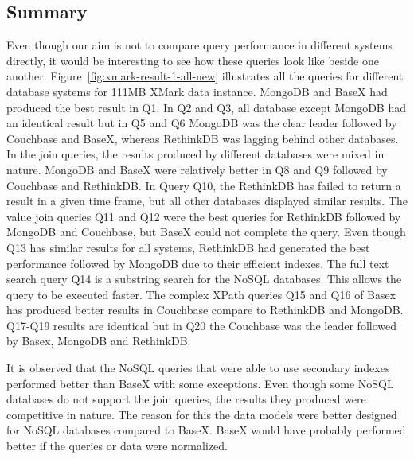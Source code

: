 \subsection{Summary}
Even though our aim is not to compare query performance in different systems directly, it would be interesting to see how these queries look like beside one another. Figure~\ref{fig:xmark-result-1-all-new} illustrates all the queries for different database systems for 111MB XMark data instance. MongoDB and BaseX had produced the best result in Q1. In Q2 and Q3, all database except MongoDB  had an identical result but in Q5 and Q6 MongoDB was the clear leader followed by Couchbase and BaseX, whereas RethinkDB was lagging behind other databases. In the join queries, the results produced by different databases were mixed in nature. MongoDB and BaseX were relatively better in Q8 and Q9 followed by Couchbase and RethinkDB. In Query Q10, the RethinkDB has failed to return a result in a given time frame, but all other databases displayed similar results. The value join queries Q11 and Q12 were the best queries for RethinkDB followed by MongoDB and Couchbase, but BaseX could not complete the query. Even though Q13 has similar results for all systems, RethinkDB had generated the best performance followed by MongoDB due to their efficient indexes. The full text search query Q14 is a substring search for the NoSQL databases. This allows the query to be executed faster. The complex XPath queries Q15 and Q16 of Basex has produced better results in Couchbase compare to RethinkDB and MongoDB.
Q17-Q19 results are identical but in Q20 the Couchbase was the leader followed by Basex, MongoDB and RethinkDB. 
\par
It is observed that the NoSQL queries that were able to use secondary indexes performed better than BaseX with some exceptions. Even though some NoSQL databases do not support the join queries, the results they produced were competitive in nature. The reason for this the data models were better designed for NoSQL databases compared to BaseX. BaseX would have probably performed better if the queries or data were normalized.
